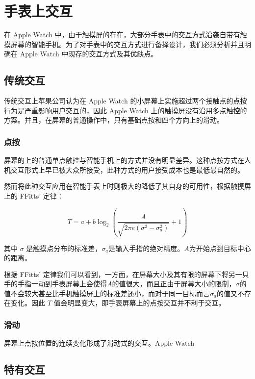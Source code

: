 \chapter{手表上交互}

\quad\quad 在 Apple Watch 中，由于触摸屏的存在，大部分手表中的交互方式沿袭自带有触摸屏幕的智能手机\cite{WatchGuidelines:2016}。为了对手表中的交互方式进行备择设计，我们必须分析并且明确在 Apple Watch 中现存的交互方式及其优缺点。

\section{传统交互}

传统交互上苹果公司认为在 Apple Watch 的小屏幕上实施超过两个接触点的点按行为是严重影响用户交互的，因此 Apple Watch 上的触摸屏没有沿用多点触控的方案。并且，在屏幕的普通操作中，只有基础点按和四个方向上的滑动。

\subsection{点按}

屏幕的上的普通单点触控与智能手机上的方式并没有明显差异。这种点按方式在人机交互形式上早已被大众所接受，此种方式的用户接受成本也是最低最自然的。

然而将此种交互应用在智能手表上时则极大的降低了其自身的可用性，根据触摸屏上的 FFitts' 定律\cite{Bi:2013:FLM:2470654.2466180}：

\begin{equation}
T=a+b\log_{2}{\left(\frac{A}{\sqrt{2\pi e(\sigma^2-\sigma_{a}^2)}}+1 \right)}
\end{equation}

其中 $\sigma$ 是触摸点分布的标准差，$\sigma_a$是输入手指的绝对精度。$A$为开始点到目标中心的距离。

根据 FFitts' 定律我们可以看到，一方面，在屏幕大小及其有限的屏幕下将另一只手的手指一动到手表屏幕上会使得$A$的值很大，而且正由于屏幕大小的限制，$\sigma$的值不会较大甚至比手机触摸屏上的标准差还小，而对于同一目标而言$\sigma_a$的值又不存在变化。因此 $T$ 值会明显变大，即手表屏幕上的点按交互并不利于交互。

\subsection{滑动}

屏幕上点按位置的连续变化形成了滑动式的交互。Apple Watch

\section{特有交互}

